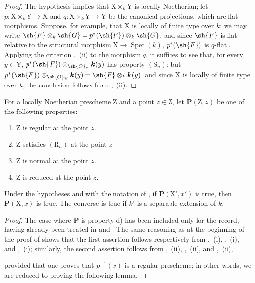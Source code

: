 \begin{proof}
The hypothesis implies that $\mathrm{X}\times_k\mathrm{Y}$ is locally Noetherian; let $p:\mathrm{X}\times_k\mathrm{Y}\to\mathrm{X}$ and $q:\mathrm{X}\times_k\mathrm{Y}\to\mathrm{Y}$ be the canonical projections, which are flat morphisms. Suppose, for example, that $\mathrm{X}$ is locally of finite type over $k$; we may write $\sh{F}\otimes_k\sh{G}=p^*(\sh{F})\otimes_k\sh{G}$, and since $\sh{F}$ is flat relative to the structural morphism $\mathrm{X}\to\operatorname{Spec}(k)$, $p^*(\sh{F})$ is $q$-flat . Applying the criterion ,~(ii) to the morphism $q$, it suffices to see that, for every $y\in\mathrm{Y}$, $p^*(\sh{F})\otimes_{\sh{O}_{\mathrm{Y}}}\boldsymbol{k}(y)$ has property $(\mathrm{S}_n)$; but
$p^*(\sh{F})\otimes_{\sh{O}_{\mathrm{Y}}}\boldsymbol{k}(y)=\sh{F}\otimes_k\boldsymbol{k}(y)$, and since $\mathrm{X}$ is locally of finite type over $k$, the conclusion follows from ,~(ii).
\end{proof}

\begin{proposition}[6.7.4]
\label{IV.6.7.4}
For a locally Noetherian prescheme $\mathrm{Z}$ and a point $z\in\mathrm{Z}$, let $\boldsymbol{P}(\mathrm{Z},z)$ be one of the following properties:
\begin{enumerate}[label=\alph*)]
  \item $\mathrm{Z}$ is regular at the point $z$.
  \item $\mathrm{Z}$ satisfies $(\mathrm{R}_n)$ at the point $z$.
  \item $\mathrm{Z}$ is normal at the point $z$.
  \item $\mathrm{Z}$ is reduced at the point $z$.
\end{enumerate}
Under the hypotheses and with the notation of , if $\boldsymbol{P}(\mathrm{X}',x')$ is true, then $\boldsymbol{P}(\mathrm{X},x)$ is true. The converse is true if $k'$ is a separable extension of $k$.
\end{proposition}

\begin{proof}
The case where $\boldsymbol{P}$ is property d) has been included only for the record, having already been treated in  and . The same reasoning as at the beginning of the proof of  shows that the first assertion follows respectively from ,~(i), ,~(i), and ,~(i); similarly, the second assertion follows from ,~(ii), ,~(ii), and ,~(ii),


provided that one proves that $p^{-1}(x)$ is a regular prescheme; in other words, we are reduced to proving the following lemma.
\end{proof}


